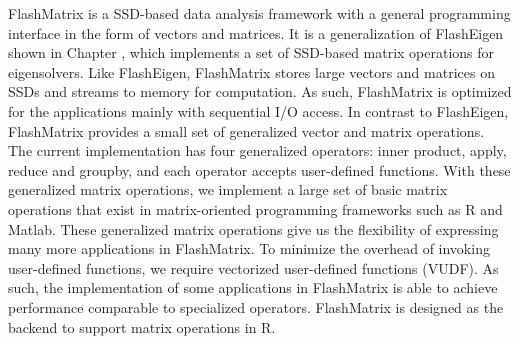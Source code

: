 FlashMatrix is a SSD-based data analysis framework with a general programming
interface in the form of vectors and matrices. It is a generalization of
FlashEigen shown in Chapter \cite{sec:fe}, which implements a set of SSD-based
matrix operations for eigensolvers. Like FlashEigen, FlashMatrix stores large
vectors and matrices on SSDs and streams to memory for computation. As such,
FlashMatrix is optimized for the applications mainly with sequential I/O access.
In contrast to FlashEigen, FlashMatrix provides a small set
of generalized vector and matrix operations. The current implementation has
four generalized operators: inner product, apply, reduce and groupby,
and each operator accepts user-defined functions. With these generalized
matrix operations, we implement a large set of basic matrix operations that
exist in matrix-oriented programming frameworks such as R and Matlab. These
generalized matrix operations give us the flexibility of expressing many more
applications in FlashMatrix.
To minimize the overhead of invoking user-defined functions, we require
vectorized user-defined functions (VUDF). As such, the implementation of
some applications in FlashMatrix is able to achieve performance comparable
to specialized operators.
FlashMatrix is designed as the backend to support matrix operations in R.
